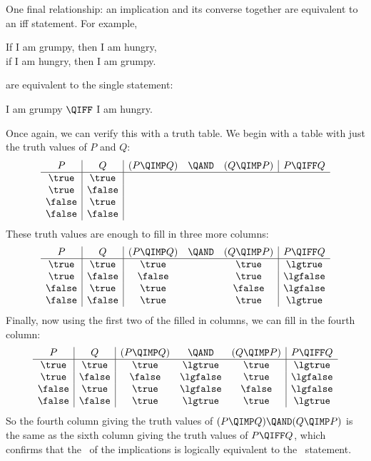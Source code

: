 One final relationship: an implication and its converse together are
equivalent to an iff statement.  For example,
%
\begin{center}
If I am grumpy, then I am hungry, \QAND \\
if I am hungry, then I am grumpy.
\end{center}
%
are equivalent to the single statement:
%
\begin{center}
I am grumpy $\QIFF$ I am hungry.
\end{center}
%
Once again, we can verify this with a truth table.  We begin with a table
with just the truth values of $P$ and $Q$:
%
\[
\begin{array}{c|c|ccc|c}
P & Q & (P \QIMP Q) &\QAND & (Q  \QIMP  P) & P \QIFF Q \\
\hline
\true  &  \true\\
\true  &  \false\\
\false &  \true\\
\false &  \false
\end{array}
\]
These truth values are enough to fill in three more columns:
\[
\begin{array}{c|c|ccc|c}
P & Q & (P \QIMP Q) &\QAND & (Q  \QIMP  P) & P \QIFF Q \\
\hline
\true  &  \true  &\true  &&\true & \lgtrue \\
\true  &  \false &\false &&\true & \lgfalse\\
\false &  \true  &\true  &&\false& \lgfalse\\
\false &  \false &\true  &&\true & \lgtrue 
\end{array}
\]
Finally, now using the first two of the filled in columns, we can fill in
the fourth column:
\[
\begin{array}{c|c|ccc|c}
P & Q & (P \QIMP Q) &\QAND & (Q  \QIMP  P) & P \QIFF Q \\
\hline
\true  &  \true  &\true  &\lgtrue &\true & \lgtrue \\
\true  &  \false &\false &\lgfalse&\true & \lgfalse\\
\false &  \true  &\true  &\lgfalse&\false& \lgfalse\\
\false &  \false &\true  &\lgtrue &\true & \lgtrue
\end{array}
\]
So the fourth column giving the truth values of $(P \QIMP Q) \QAND (Q
\QIMP P)$ is the same as the sixth column giving the truth values of $P
\QIFF Q$, which confirms that the \QAND\ of the implications is logically
equivalent to the \QIFF\ statement.


